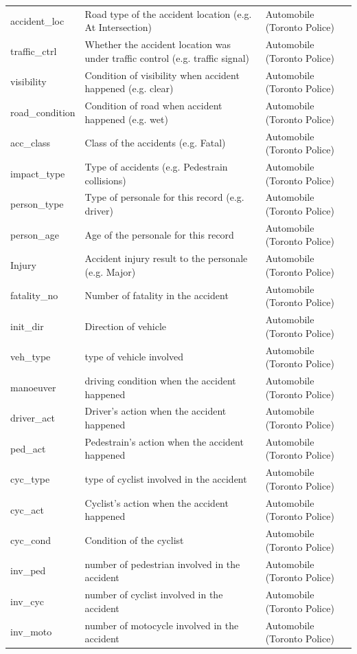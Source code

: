 \documentclass[]{article}
\begin{document}
\begin{table}[H]
\begin{tabular}{lll}
accident\_loc & Road type of the accident location (e.g. At Intersection) & Automobile (Toronto Police)\\
traffic\_ctrl & Whether the accident location was under traffic control (e.g. traffic signal) & Automobile (Toronto Police)\\
visibility & Condition of visibility when accident happened (e.g. clear) & Automobile (Toronto Police)\\
road\_condition & Condition of road when accident happened (e.g. wet) & Automobile (Toronto Police)\\
acc\_class & Class of the accidents (e.g. Fatal) & Automobile (Toronto Police)\\
impact\_type & Type of accidents (e.g. Pedestrain collisions) & Automobile (Toronto Police)\\
person\_type & Type of personale for this record (e.g. driver) & Automobile (Toronto Police)\\
person\_age & Age of the personale for this record & Automobile (Toronto Police)\\
Injury & Accident injury result to the personale (e.g. Major) & Automobile (Toronto Police)\\
fatality\_no & Number of fatality in the accident & Automobile (Toronto Police)\\
init\_dir & Direction of vehicle & Automobile (Toronto Police)\\
veh\_type & type of vehicle involved & Automobile (Toronto Police)\\
manoeuver & driving condition when the accident happened & Automobile (Toronto Police)\\
driver\_act & Driver's action when the accident happened & Automobile (Toronto Police)\\
ped\_act & Pedestrain's action when the accident happened & Automobile (Toronto Police)\\
cyc\_type & type of cyclist involved in the accident & Automobile (Toronto Police)\\
cyc\_act & Cyclist's action when the accident happened & Automobile (Toronto Police)\\
cyc\_cond & Condition of the cyclist & Automobile (Toronto Police)\\
inv\_ped & number of pedestrian involved in the accident & Automobile (Toronto Police)\\
inv\_cyc & number of cyclist involved in the accident & Automobile (Toronto Police)\\
inv\_moto & number of motocycle involved in the accident & Automobile (Toronto Police)\\

\end{tabular}
\end{table}
\end{document}
